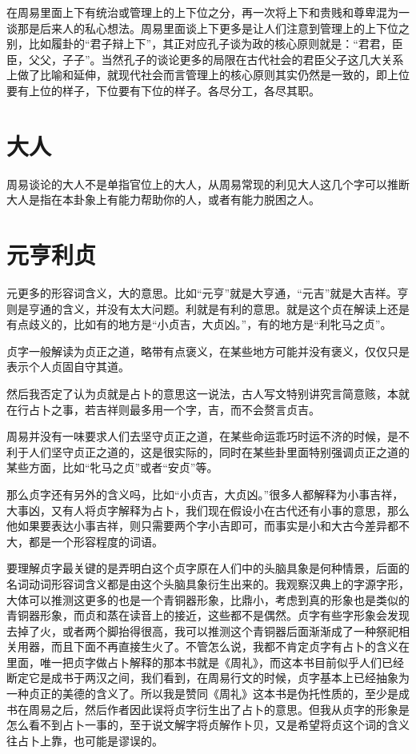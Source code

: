 \documentclass[12pt,oneside]{book}
\begin{document}
在周易里面上下有统治或管理上的上下位之分，再一次将上下和贵贱和尊卑混为一谈那是后来人的私心想法。周易里面谈上下更多是让人们注意到管理上的上下位之别，比如履卦的“君子辩上下”，其正对应孔子谈为政的核心原则就是：“君君，臣臣，父父，子子”。当然孔子的谈论更多的局限在古代社会的君臣父子这几大关系上做了比喻和延伸，就现代社会而言管理上的核心原则其实仍然是一致的，即上位要有上位的样子，下位要有下位的样子。各尽分工，各尽其职。

\section{大人}
周易谈论的大人不是单指官位上的大人，从周易常现的利见大人这几个字可以推断大人是指在本卦象上有能力帮助你的人，或者有能力脱困之人。

\section{元亨利贞}
元更多的形容词含义，大的意思。比如“元亨”就是大亨通，“元吉”就是大吉祥。亨则是亨通的含义，并没有太大问题。利就是有利的意思。就是这个贞在解读上还是有点歧义的，比如有的地方是“小贞吉，大贞凶。”，有的地方是“利牝马之贞”。

贞字一般解读为贞正之道，略带有点褒义，在某些地方可能并没有褒义，仅仅只是表示个人贞固自守其道。

然后我否定了认为贞就是占卜的意思这一说法，古人写文特别讲究言简意赅，本就在行占卜之事，若吉祥则最多用一个字，吉，而不会赘言贞吉。

周易并没有一味要求人们去坚守贞正之道，在某些命运乖巧时运不济的时候，是不利于人们坚守贞正之道的，这是很实际的，同时在某些卦里面特别强调贞正之道的某些方面，比如“牝马之贞”或者“安贞”等。

那么贞字还有另外的含义吗，比如“小贞吉，大贞凶。”很多人都解释为小事吉祥，大事凶，又有人将贞字解释为占卜，我们现在假设小在古代还有小事的意思，那么他如果要表达小事吉祥，则只需要两个字小吉即可，而事实是小和大古今差异都不大，都是一个形容程度的词语。

要理解贞字最关键的是弄明白这个贞字原在人们中的头脑具象是何种情景，后面的名词动词形容词含义都是由这个头脑具象衍生出来的。我观察汉典上的字源字形，大体可以推测这更多的也是一个青铜器形象，比鼎小，考虑到真的形象也是类似的青铜器形象，而贞和蒸在读音上的接近，这些都不是偶然。贞字有些字形象会发现去掉了火，或者两个脚抬得很高，我可以推测这个青铜器后面渐渐成了一种祭祀相关用器，而且下面不再直接生火了。不管怎么说，我都不肯定贞字有占卜的含义在里面，唯一把贞字做占卜解释的那本书就是《周礼》，而这本书目前似乎人们已经断定它是成书于两汉之间，我们看到，在周易行文的时候，贞字基本上已经抽象为一种贞正的美德的含义了。所以我是赞同《周礼》这本书是伪托性质的，至少是成书在周易之后，然后作者因此误将贞字衍生出了占卜的意思。但我从贞字的形象是怎么看不到占卜一事的，至于说文解字将贞解作卜贝，又是希望将贞这个词的含义往占卜上靠，也可能是谬误的。
\end{document}
